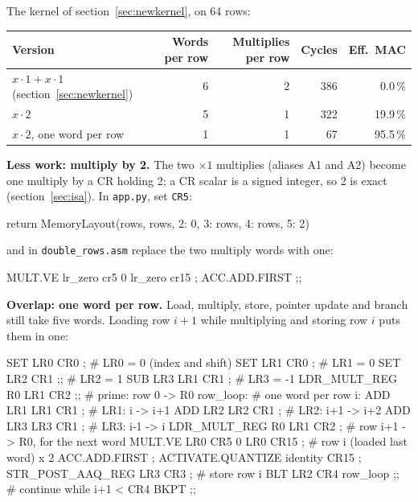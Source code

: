 \documentclass[11pt,a4paper]{article}
\begin{document}
The kernel of section~\ref{sec:newkernel}, on 64 rows:

\begin{center}
\small
\begin{tabular}{lrrrr}
\toprule
Version & Words per row & Multiplies per row & Cycles & Eff.\ MAC \\
\midrule
$x \cdot 1 + x \cdot 1$ (section~\ref{sec:newkernel}) & 6 & 2 & 386 & 0.0\,\% \\
$x \cdot 2$ & 5 & 1 & 322 & 19.9\,\% \\
$x \cdot 2$, one word per row & 1 & 1 & 67 & 95.5\,\% \\
\bottomrule
\end{tabular}
\end{center}

\textbf{Less work: multiply by 2.} The two $\times 1$ multiplies (aliases A1
and A2) become one multiply by a CR holding 2; a CR scalar is a signed integer,
so 2 is exact (section~\ref{sec:isa}). In \texttt{app.py}, set \texttt{CR5}:

\begin{pycode}
        return MemoryLayout(rows, rows, {2: 0, 3: rows, 4: rows, 5: 2})
\end{pycode}

and in \texttt{double\_rows.asm} replace the two multiply words with one:

\begin{pycode}
    MULT.VE {{lr_zero}} cr5 0 {{lr_zero}} cr15 ;
    ACC.ADD.FIRST ;;
\end{pycode}

\needspace{0.42\textheight}
\textbf{Overlap: one word per row.} Load, multiply, store, pointer update and
branch still take five words. Loading row $i+1$ while multiplying and storing
row $i$ puts them in one:

\begin{pycode}
    SET LR0 CR0 ;                       # LR0 = 0 (index and shift)
    SET LR1 CR0 ;                       # LR1 = 0
    SET LR2 CR1 ;;                      # LR2 = 1
    SUB LR3 LR1 CR1 ;                   # LR3 = -1
    LDR_MULT_REG R0 LR1 CR2 ;;          # prime: row 0 -> R0
row_loop:                               # one word per row i:
    ADD LR1 LR1 CR1 ;                   #   LR1: i -> i+1
    ADD LR2 LR2 CR1 ;                   #   LR2: i+1 -> i+2
    ADD LR3 LR3 CR1 ;                   #   LR3: i-1 -> i
    LDR_MULT_REG R0 LR1 CR2 ;           #   row i+1 -> R0, for the next word
    MULT.VE LR0 CR5 0 LR0 CR15 ;        #   row i (loaded last word) x 2
    ACC.ADD.FIRST ;
    ACTIVATE.QUANTIZE identity CR15 ;
    STR_POST_AAQ_REG LR3 CR3 ;          #   store row i
    BLT LR2 CR4 row_loop ;;             #   continue while i+1 < CR4
    BKPT ;;
\end{pycode}
\end{document}
